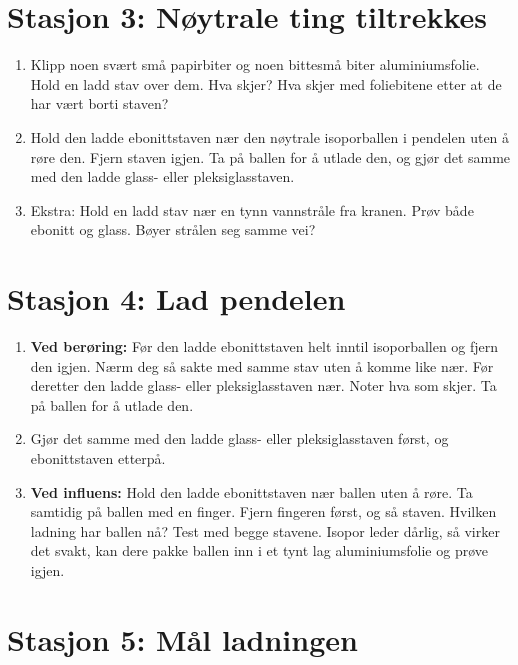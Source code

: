 \documentclass[11pt]{article}
\begin{document}
\section*{Stasjon 3: Nøytrale ting tiltrekkes}

\begin{enumerate}
\item Klipp noen svært små papirbiter og noen bittesmå biter aluminiumsfolie. Hold en ladd stav over dem. Hva skjer? Hva skjer med foliebitene etter at de har vært borti staven?
\item Hold den ladde ebonittstaven nær den nøytrale isoporballen i pendelen uten å røre den. Fjern staven igjen. Ta på ballen for å utlade den, og gjør det samme med den ladde glass- eller pleksiglasstaven.
\item Ekstra: Hold en ladd stav nær en tynn vannstråle fra kranen. Prøv både ebonitt og glass. Bøyer strålen seg samme vei?
\end{enumerate}

\section*{Stasjon 4: Lad pendelen}

\begin{enumerate}
\item \textbf{Ved berøring:} Før den ladde ebonittstaven helt inntil isoporballen og fjern den igjen. Nærm deg så sakte med samme stav uten å komme like nær. Før deretter den ladde glass- eller pleksiglasstaven nær. Noter hva som skjer. Ta på ballen for å utlade den.
\item Gjør det samme med den ladde glass- eller pleksiglasstaven først, og ebonittstaven etterpå.
\item \textbf{Ved influens:} Hold den ladde ebonittstaven nær ballen uten å røre. Ta samtidig på ballen med en finger. Fjern fingeren først, og så staven. Hvilken ladning har ballen nå? Test med begge stavene. Isopor leder dårlig, så virker det svakt, kan dere pakke ballen inn i et tynt lag aluminiumsfolie og prøve igjen.
\end{enumerate}

\section*{Stasjon 5: Mål ladningen}
\end{document}
